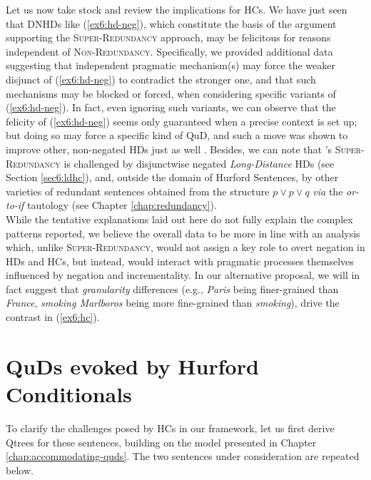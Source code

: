 Let us now take stock and review the implications for HCs. We have just seen that DNHDs like (\ref{ex6:hd-neg}), which constitute the basis of the argument supporting the \textsc{Super-Redundancy} approach, may be felicitous for reasons independent of \textsc{Non-Redundancy}. Specifically, we provided additional data suggesting that independent pragmatic mechanism(s) may force the weaker disjunct of (\ref{ex6:hd-neg}) to contradict the stronger one, and that such mechanisms may be blocked or forced, when considering specific variants of (\ref{ex6:hd-neg}). In fact, even ignoring such variants, we can observe that the felicity of (\ref{ex6:hd-neg}) seems only guaranteed when a precise context is set up; but doing so may force a specific kind of QuD, and such a move was shown to improve other, non-negated HDs just as well \parencite{Haslinger2023}. Besides, we can note that \cite{Kalomoiros2024}'s \textsc{Super-Redundancy} is challenged by disjunctwise negated \textit{Long-Distance} HDs (see Section \ref{sec6:ldhc}), and, outside the domain of Hurford Sentences, by other varieties of redundant sentences obtained from the structure $p\vee p \vee q$ \textit{via} the \textit{or-to-if} tautology (see Chapter \ref{chap:redundancy}).\\

While the tentative explanations laid out here do not fully explain the complex patterns reported, we believe the overall data to be more in line with an analysis which, unlike \textsc{Super-Redundancy}, would not assign a key role to overt negation in HDs and HCs, but instead, would interact with pragmatic processes themselves influenced by negation and incrementality. In our alternative proposal, we will in fact suggest that \textit{granularity} differences (e.g., \textit{Paris} being finer-grained than \textit{France}, \textit{smoking Marlboros} being more fine-grained than \textit{smoking}), drive the contrast in (\ref{ex6:hc}).



\section{QuDs evoked by Hurford Conditionals}\label{sec6:machinery}


To clarify the challenges posed by HCs in our framework, let us first derive Qtrees for these sentences, building on the model presented in Chapter \ref{chap:accommodating-quds}. The two sentences under consideration are repeated below. 

